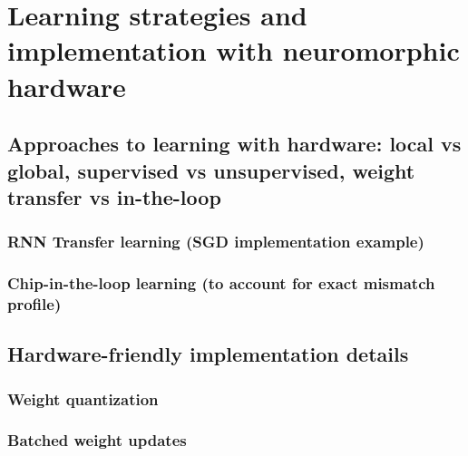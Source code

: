 \chapter{Learning strategies and implementation with neuromorphic hardware}
\label{ch:Plasticity_and_learning}

\section{Approaches to learning with hardware: local vs global, supervised vs unsupervised, weight transfer vs in-the-loop}

\subsection{RNN Transfer learning (SGD implementation example)}

\subsection{Chip-in-the-loop learning (to account for exact mismatch profile)}

\section{Hardware-friendly implementation details}
\subsection{Weight quantization}
\subsection{Batched weight updates}
